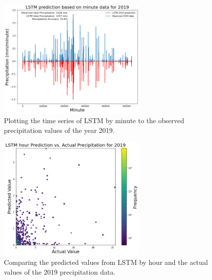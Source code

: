 \documentclass[11pt]{report}
\begin{document}
\begin{figure}[bh!]
	\centering
	\includegraphics[width = 0.65\textwidth]{Figures/LSTM_minute.png}
	\caption[LSTM time series to observed precipitation time series in 2019 by minute]{\label{LSTM_minute}
		Plotting the time series of LSTM by minute to the observed
		precipitation values of the year 2019.
	}
\end{figure}
\clearpage
\begin{figure}[th!]
	\centering
	\includegraphics[width = 0.65\textwidth]{Figures/LSTM_hour_compare.png}
	\caption[\label{LSTM_hour_compare}LSTM hour prediction vs. actual data]{
		Comparing the predicted values from LSTM by hour and the actual values of the 2019 precipitation data.
	}
\end{figure}
\end{document}
